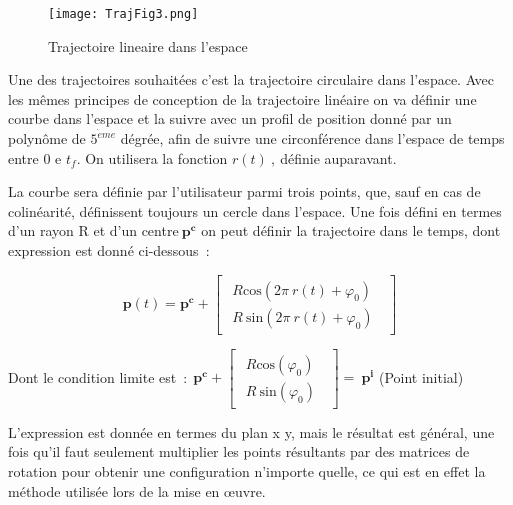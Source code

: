 \begin{figure}[H]
	\centering	%
	\captionsetup{justification=centering,margin=1cm}
	\texttt{[image: TrajFig3.png]}
	\caption{Trajectoire lineaire dans l'espace}
	\label{eller3}
\end{figure}


Une des trajectoires souhait\'{e}es c'est la trajectoire circulaire dans l'espace. Avec les m\^{e}mes principes de conception de la trajectoire lin\'{e}aire on va d\'{e}finir une courbe dans l'espace et la suivre avec un profil de position donn\'{e} par un polyn\^{o}me de ${5}^{\grave{e}me}$ d\'{e}gr\'{e}e, afin de suivre une circonf\'{e}rence dans l'espace de temps entre 0 e $t_f$. On utilisera la fonction $r(t)\ ,\ $d\'{e}finie auparavant.

La courbe sera d\'{e}finie par l'utilisateur parmi trois points, que, sauf en cas de colin\'{e}arit\'{e}, d\'{e}finissent toujours un cercle dans l'espace. Une fois d\'{e}fini en termes d'un rayon R et d'un centre${\boldsymbol{\ }\boldsymbol{p}}^{\boldsymbol{c}}$ on peut d\'{e}finir la trajectoire dans le temps, dont expression est donn\'{e} ci-dessous~: 

\[\boldsymbol{p}\left(t\right)={\boldsymbol{p}}^{\boldsymbol{c}}+\left[ \begin{array}{c}
\begin{array}{c}
R{\mathrm{cos} (2\pi \ r\left(t\right)+{\varphi }_0)\ } \\ 
R\ {\mathrm{sin} (2\pi \ r\left(t\right)+{\varphi }_0)\ } \end{array}
\end{array}
\right]\] 

\vspace{3pt}
Dont le condition limite est~:$\boldsymbol{\ }\boldsymbol{\ }{\boldsymbol{p}}^{\boldsymbol{c}}+\left[ \begin{array}{c}
\begin{array}{c}
R{\mathrm{cos} ({\varphi }_0)\ } \\ 
R\ {\mathrm{sin} ({\varphi }_0)\ } \end{array}
\end{array}
\right]=\ {\boldsymbol{p}}^{\boldsymbol{i}}$\textbf{ }(Point initial)

\bigbreak

L'expression est donn\'{e}e en termes du plan x y, mais le r\'{e}sultat est g\'{e}n\'{e}ral, une fois qu'il faut seulement multiplier les points r\'{e}sultants par des matrices de rotation pour obtenir une configuration n'importe quelle, ce qui est en effet la m\'{e}thode utilis\'{e}e lors de la mise en {\oe}uvre.

